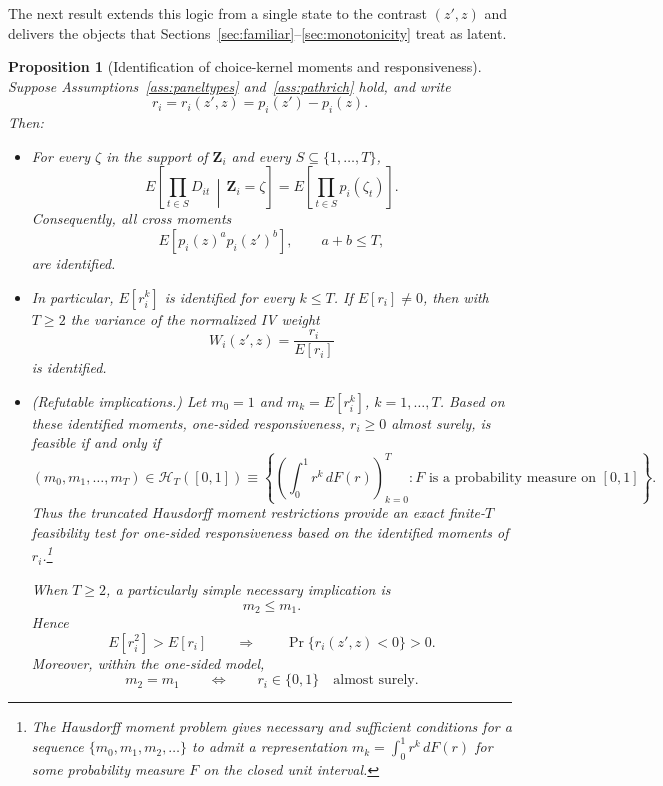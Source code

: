 \documentclass[11pt]{article}
\newtheorem{proposition}{Proposition}
\newcommand{\1}{\mathbf{1}}
\begin{document}
The next result extends this logic from a single state to the contrast $(z', z)$ and delivers the objects that Sections~\ref{sec:familiar}--\ref{sec:monotonicity} treat as latent.


\begin{proposition}[Identification of choice-kernel moments and responsiveness]
\label{prop:choicemoments}
Suppose Assumptions~\ref{ass:paneltypes} and~\ref{ass:pathrich} hold, and write
\[
r_i=r_i(z',z)=p_i(z')-p_i(z).
\]
Then:
\begin{itemize}

\item[(a)] For every $\zeta$ in the support of $\mathbf{Z}_i$ and every
$S\subseteq\{1,\ldots,T\}$,
\[
E\left[
\prod_{t\in S}D_{it}
\,\middle|\,
\mathbf{Z}_i=\zeta
\right]
=
E\left[
\prod_{t\in S}p_i(\zeta_t)
\right].
\]
Consequently, all cross moments
\[
E\left[p_i(z)^a p_i(z')^b\right],
\qquad a+b\leq T,
\]
are identified.

\item[(b)] In particular, $E[r_i^k]$ is identified for every $k\leq T$.
If $E[r_i]\neq0$, then with $T\geq2$ the variance of the normalized IV weight
\[
W_i(z',z)=\frac{r_i}{E[r_i]}
\]
is identified.

\item[(c)] (\emph{Refutable implications.})
Let $m_0=1$ and $m_k=E[r_i^k]$, $k=1,\ldots,T$. Based on these identified
moments, one-sided responsiveness, $r_i\geq0$ almost surely, is feasible if
and only if
\begin{equation}
(m_0,m_1,\ldots,m_T)\in
\mathcal H_T([0,1])
\equiv
\left\{
\left(\int_0^1 r^k\,dF(r)\right)_{k=0}^{T}
:
F\text{ is a probability measure on }[0,1]
\right\}.
\label{eq:hausdorff}
\end{equation}
Thus the truncated Hausdorff moment restrictions provide an exact
finite-$T$ feasibility test for one-sided responsiveness based on the
identified moments of $r_i$.\footnote{The Hausdorff moment problem gives
necessary and sufficient conditions for a sequence
$\{m_0,m_1,m_2,\ldots\}$ to admit a representation
$m_k=\int_0^1 r^k\,dF(r)$ for some probability measure $F$ on the closed
unit interval.}

When $T\geq2$, a particularly simple necessary implication is
\[
m_2\leq m_1.
\]
Hence
\[
E[r_i^2]>E[r_i]
\qquad\Longrightarrow\qquad
\Pr\{r_i(z',z)<0\}>0.
\]
Moreover, within the one-sided model,
\[
m_2=m_1
\qquad\Longleftrightarrow\qquad
r_i\in\{0,1\}\quad\text{almost surely}.
\]

\end{itemize}
\end{proposition}
\end{document}
